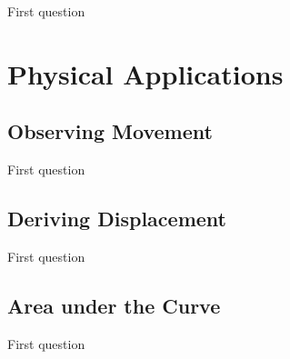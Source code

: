 \documentclass[a4paper,12pt,oneside]{exam}
\begin{document}
\begin{questions}
\question First question
\end{questions}

\newpage
\section{Physical Applications}

\subsection{Observing Movement}

\begin{questions}
\question First question
\end{questions}

\subsection{Deriving Displacement}

\begin{questions}
\question First question
\end{questions}

\subsection{Area under the Curve}

\begin{questions}
\question First question
\end{questions}


\begin{comment}
\newpage
\section{Extensions}

\subsection{Substitution}

\begin{questions}
\question First question
\end{questions}
\end{comment}
\end{document}

